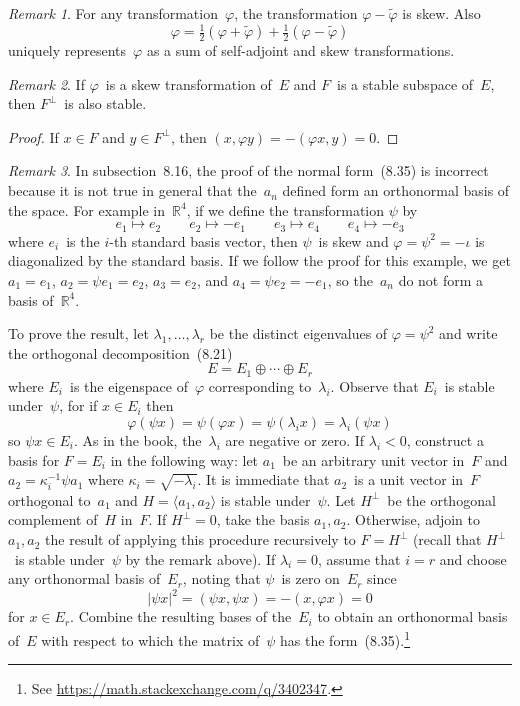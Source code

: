 \documentclass[letterpaper,12pt]{article}
\newcommand{\R}{\mathbb{R}}
\newcommand{\dsum}{\oplus}
\newcommand{\gen}[1]{\langle#1\rangle}
\newcommand{\oc}[1]{#1^{\perp}}
\newcommand{\iprod}[2]{(#1,#2)}
\newcommand{\norm}[1]{|#1|}
\newcommand{\adj}[1]{\widetilde{#1}}
\theoremstyle{definition}
\theoremstyle{remark}
\newtheorem*{rmk}{Remark}
\begin{document}
\begin{rmk}
For any transformation~\(\varphi\), the transformation \(\varphi-\adj{\varphi}\) is skew. Also
\[\varphi=\tfrac{1}{2}(\varphi+\adj{\varphi})+\tfrac{1}{2}(\varphi-\adj{\varphi})\]
uniquely represents~\(\varphi\) as a sum of self-adjoint and skew transformations.
\end{rmk}

\begin{rmk}
If \(\varphi\)~is a skew transformation of~\(E\) and \(F\)~is a stable subspace of~\(E\), then \(\oc{F}\)~is also stable.
\end{rmk}
\begin{proof}
If \(x\in F\) and \(y\in\oc{F}\), then \(\iprod{x}{\varphi y}=-\iprod{\varphi x}{y}=0\).
\end{proof}

\begin{rmk}
In subsection~8.16, the proof of the normal form~(8.35) is incorrect because it is not true in general that the~\(a_n\) defined form an orthonormal basis of the space. For example in~\(\R^4\), if we define the transformation \(\psi\) by
\[e_1\mapsto e_2\qquad e_2\mapsto -e_1\qquad e_3\mapsto e_4\qquad e_4\mapsto -e_3\]
where \(e_i\)~is the \(i\)-th standard basis vector, then \(\psi\)~is skew and \(\varphi=\psi^2=-\iota\) is diagonalized by the standard basis. If we follow the proof for this example, we get \(a_1=e_1\), \(a_2=\psi e_1=e_2\), \(a_3=e_2\), and \(a_4=\psi e_2=-e_1\), so the~\(a_n\) do not form a basis of~\(\R^4\).

To prove the result, let \(\lambda_1,\ldots,\lambda_r\) be the distinct eigenvalues of \(\varphi=\psi^2\) and write the orthogonal decomposition~(8.21)
\[E=E_1\dsum\cdots\dsum E_r\]
where \(E_i\)~is the eigenspace of~\(\varphi\) corresponding to~\(\lambda_i\). Observe that \(E_i\)~is stable under~\(\psi\), for if \(x\in E_i\) then
\[\varphi(\psi x)=\psi(\varphi x)=\psi(\lambda_i x)=\lambda_i(\psi x)\]
so \(\psi x\in E_i\). As in the book, the~\(\lambda_i\) are negative or zero. If \(\lambda_i<0\), construct a basis for \(F=E_i\) in the following way: let \(a_1\)~be an arbitrary unit vector in~\(F\) and \(a_2=\kappa_i^{-1}\psi a_1\) where \(\kappa_i=\sqrt{-\lambda_i}\). It is immediate that \(a_2\)~is a unit vector in~\(F\) orthogonal to~\(a_1\) and \(H=\gen{a_1,a_2}\) is stable under~\(\psi\). Let \(\oc{H}\)~be the orthogonal complement of~\(H\) in~\(F\). If \(\oc{H}=0\), take the basis \(a_1,a_2\). Otherwise, adjoin to \(a_1,a_2\) the result of applying this procedure recursively to \(F=\oc{H}\) (recall that \(\oc{H}\)~is stable under~\(\psi\) by the remark above). If \(\lambda_i=0\), assume that \(i=r\) and choose any orthonormal basis of~\(E_r\), noting that \(\psi\)~is zero on~\(E_r\) since
\[\norm{\psi x}^2=\iprod{\psi x}{\psi x}=-\iprod{x}{\varphi x}=0\]
for \(x\in E_r\). Combine the resulting bases of the~\(E_i\) to obtain an orthonormal basis of~\(E\) with respect to which the matrix of~\(\psi\) has the form~(8.35).\footnote{See \url{https://math.stackexchange.com/q/3402347}.}
\end{rmk}
\end{document}
